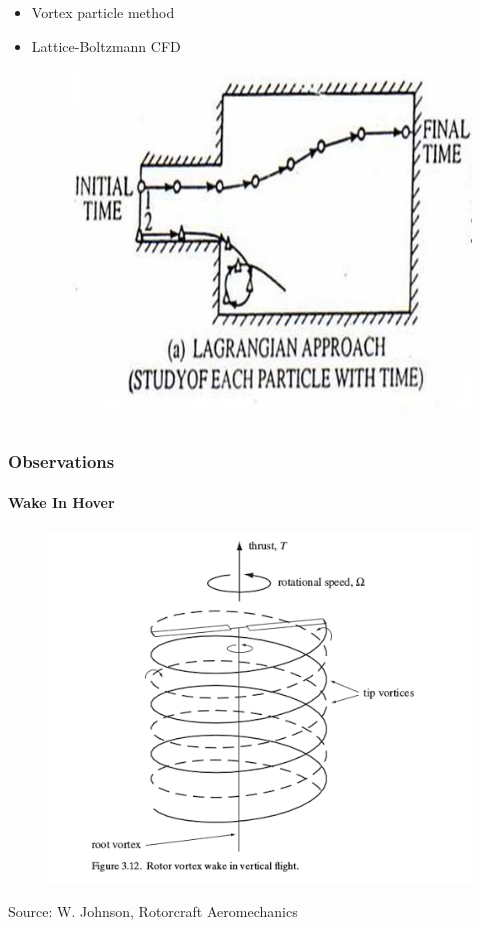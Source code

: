 \documentclass[11pt]{beamer}
\begin{document}
\begin{frame}[t]
\begin{columns}[t]
\begin{column}{0.5\textwidth}
\begin{itemize}
\begin{itemize}
			\end{itemize}
			\item Vortex particle method
			\item Lattice-Boltzmann CFD
			\begin{figure}
				\includegraphics[scale=0.38]{Lagrange.jpg}
			\end{figure}
		\end{itemize}
	\end{column}
\end{columns}
\end{frame}

\begin{frame}[t]
\frametitle{Observations}
\framesubtitle{Wake In Hover}
	\begin{figure}
		\includegraphics[scale=0.4]{helical_vortex.png}
	\end{figure}
{\tiny Source: W. Johnson, Rotorcraft Aeromechanics}
\end{frame}
\end{document}
